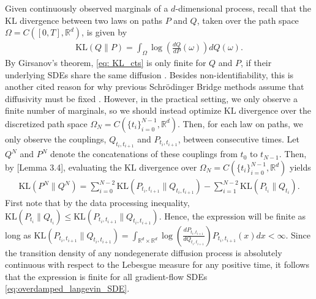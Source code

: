 \documentclass[twoside]{article}
\newcommand{\R} {\mathbb R}
\begin{document}
Given continuously observed marginals of a $d$-dimensional process, recall that the $\mathrm{KL}$ divergence between two laws on paths $P$ and $Q$, taken over the path space $\Omega = C([0,T], \R^d)$, is given by
\begin{align}
    \mathrm{KL}(Q\|P) = \int_{\Omega} \log\left(\frac{dQ}{dP}(\omega) \right)dQ(\omega).
    \label{eq: KL_cts}
\end{align}
By Girsanov's theorem, \eqref{eq: KL_cts} is only finite for $Q$ and $P$, if their underlying SDEs share the same diffusion \citep{vargas2021solving}. Besides non-identifiability, this is another cited reason for why previous Schr\"odinger Bridge methods assume that diffusivity must be fixed \citep{shen2025multi}. However, in the practical setting, we only observe a finite number of marginals, so we should instead optimize $\mathrm{KL}$ divergence over the discretized path space $\Omega_N = C(\{t_i\}_{i=0}^{N-1}, \R^d)$. Then, for each law on paths, we only observe the couplings, $Q_{t_{i}, t_{i+1}}$ and $P_{t_{i}, t_{i+1}}$, between consecutive times. Let $Q^N$ and $P^N$ denote the concatenations of these couplings from $t_0$ to $t_{N-1}$. Then, by \citet{benamou2019entropy}[Lemma 3.4], evaluating the $\mathrm{KL}$ divergence over $\Omega_N = C(\{t_i\}_{i=0}^{N-1}, \R^d)$ yields 
\begin{align}
    \mathrm{KL}(P^N\|Q^N) = \sum_{i=0}^{N-2}\mathrm{KL}(P_{t_{i}, t_{i+1}}\| Q_{t_{i}, t_{i+1}}) - \sum_{i=1}^{N-2}\mathrm{KL}(P_{t_{i}}\| Q_{t_{i}}).
    \label{eq: KL_discrete}
\end{align}
First note that by the data processing inequality, $\mathrm{KL}(P_{t_{i}}\| Q_{t_{i}}) \le \mathrm{KL}(P_{t_{i}, t_{i+1}}\| Q_{t_{i}, t_{i+1}})$. Hence, the expression will be finite as long as $\mathrm{KL}(P_{t_{i}, t_{i+1}}\| Q_{t_{i}, t_{i+1}}) = \int_{\R^d \times \R^d} \log\left(\frac{dP_{t_{i}, t_{i+1}}}{dQ_{t_{i}, t_{i+1}}}\right)P_{t_{i}, t_{i+1}}(x)dx<\infty$. Since the transition density of any nondegenerate diffusion process is absolutely continuous with respect to the Lebesgue measure for any positive time, it follows that the expression is finite for all gradient-flow SDEs \eqref{eq:overdamped_langevin_SDE}. 
\end{document}
